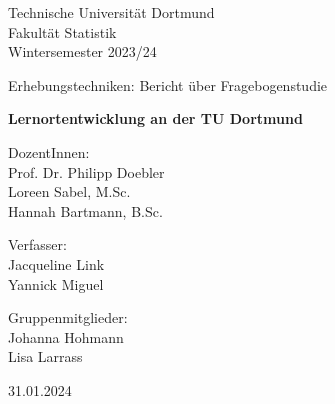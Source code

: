 \documentclass[11pt, a4paper]{article}
\begin{document}
\thispagestyle{empty}

\begin{center}
	\Large
	Technische Universität Dortmund\\
	Fakultät Statistik\\
	Wintersemester 2023/24\\
	
	\vspace{6em}
	
	Erhebungstechniken: Bericht über Fragebogenstudie
	
	\Huge
	\textbf{Lernortentwicklung an der TU Dortmund}
	
	\Large
	\vspace{4em}
	DozentInnen:	\\Prof. Dr. Philipp Doebler \\Loreen Sabel, M.Sc.\\Hannah Bartmann, B.Sc.


	\vspace{6em}
	Verfasser: \\
	Jacqueline Link \\ Yannick Miguel
	
	\vspace{6em}
	Gruppenmitglieder:\\
	Johanna Hohmann\\
	Lisa Larrass
	
    \vspace{6em}
    
	31.01.2024
\end{center}

\newpage \null\thispagestyle{empty}\newpage
\tableofcontents
\newpage\null\thispagestyle{empty}\newpage
\end{document}
